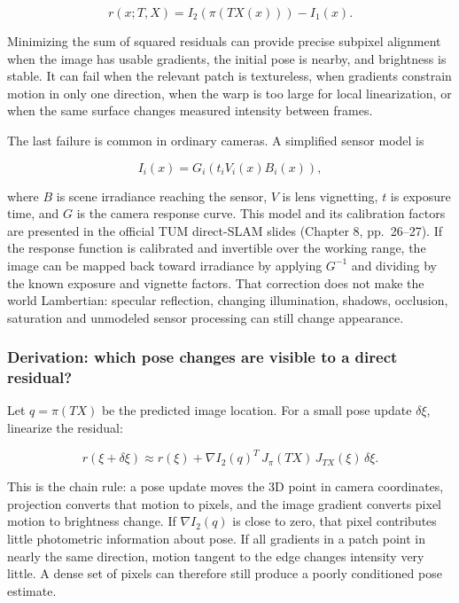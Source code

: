 \[
r(x;T,X)=I_2\!\left(\pi(TX(x))\right)-I_1(x).
\]

Minimizing the sum of squared residuals can provide precise subpixel alignment when the image has usable gradients, the initial pose is nearby, and brightness is stable. It can fail when the relevant patch is textureless, when gradients constrain motion in only one direction, when the warp is too large for local linearization, or when the same surface changes measured intensity between frames.

The last failure is common in ordinary cameras. A simplified sensor model is

\[
I_i(x)=G_i\!\left(t_i V_i(x) B_i(x)\right),
\]

where \(B\) is scene irradiance reaching the sensor, \(V\) is lens vignetting, \(t\) is exposure time, and \(G\) is the camera response curve. This model and its calibration factors are presented in the official TUM direct-SLAM slides (Chapter 8, pp.~26--27). If the response function is calibrated and invertible over the working range, the image can be mapped back toward irradiance by applying \(G^{-1}\) and dividing by the known exposure and vignette factors. That correction does not make the world Lambertian: specular reflection, changing illumination, shadows, occlusion, saturation and unmodeled sensor processing can still change appearance.

\subsubsection{Derivation: which pose changes are visible to a direct residual?}\label{02-foundations-ii-ch036-derivation-which-pose-changes-are-visible-to-a-direct-residual}

Let \(q=\pi(TX)\) be the predicted image location. For a small pose update \(\delta\xi\), linearize the residual:

\[
r(\xi+\delta\xi) \approx r(\xi)+\nabla I_2(q)^T\,J_\pi(TX)\,J_{TX}(\xi)\,\delta\xi.
\]

This is the chain rule: a pose update moves the 3D point in camera coordinates, projection converts that motion to pixels, and the image gradient converts pixel motion to brightness change. If \(\nabla I_2(q)\) is close to zero, that pixel contributes little photometric information about pose. If all gradients in a patch point in nearly the same direction, motion tangent to the edge changes intensity very little. A dense set of pixels can therefore still produce a poorly conditioned pose estimate.

